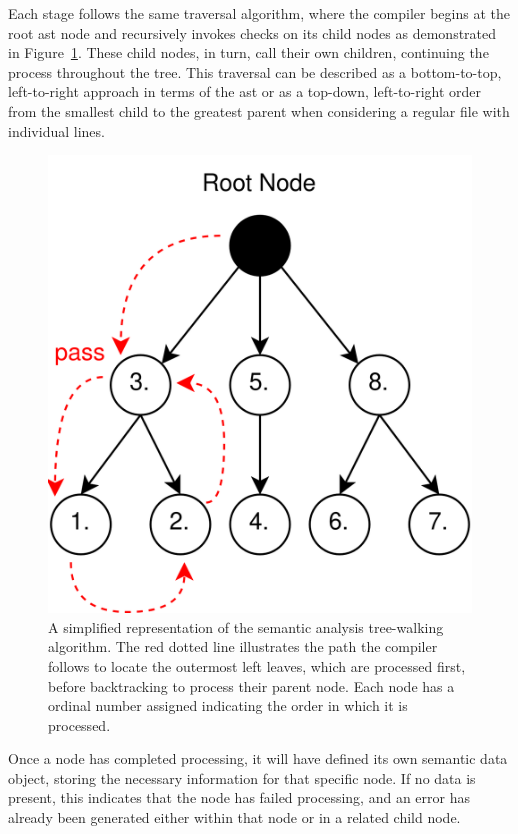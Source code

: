 Each stage follows the same traversal algorithm, where the compiler begins at the root \acrshort{ast} node and recursively invokes checks on its child nodes as demonstrated in Figure~\ref{fig:implementation:semantic-analysis-tree-walking}. These child nodes, in turn, call their own children, continuing the process throughout the tree. This traversal can be described as a bottom-to-top, left-to-right approach in terms of the \acrshort{ast} or as a top-down, left-to-right order from the smallest child to the greatest parent when considering a regular file with individual lines.

\begin{figure}[h!]
	\centering
	\includegraphics[scale=1]{./pics/Semantic-Analysis-Tree-Walking.drawio}
	\caption{A simplified representation of the semantic analysis tree-walking algorithm. The red dotted line illustrates the path the compiler follows to locate the outermost left leaves, which are processed first, before backtracking to process their parent node. Each node has a ordinal number assigned indicating the order in which it is processed.}
	\label{fig:implementation:semantic-analysis-tree-walking}
\end{figure}

Once a node has completed processing, it will have defined its own semantic data object, storing the necessary information for that specific node. If no data is present, this indicates that the node has failed processing, and an error has already been generated either within that node or in a related child node.

